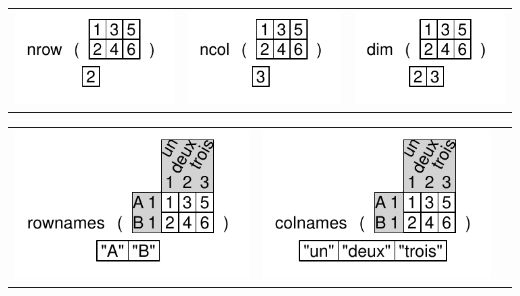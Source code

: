 \documentclass[pdflatex]{article}
\begin{document}
\begin{tabular}{ccc}
\includegraphics{nrow.pdf} & \includegraphics{ncol.pdf} & \includegraphics{dim.pdf}
\end{tabular}

\begin{tabular}{ccc}
\includegraphics{rownames.pdf} & \includegraphics{colnames.pdf}
\end{tabular}
\end{document}
